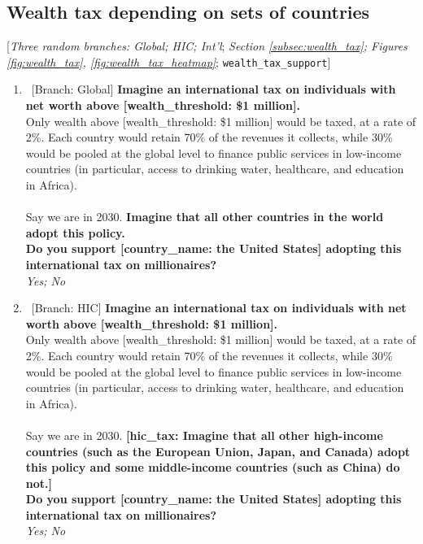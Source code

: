 \documentclass[12pt,english]{article}
\begin{document}
\begin{bibunit}
\begin{enumerate}[resume]
\end{enumerate} 

 \subsection*{Wealth tax depending on sets of countries} 
 [\textit{Three random branches: Global; HIC; Int'l}; \textit{Section \ref{subsec:wealth_tax}; Figures \ref{fig:wealth_tax}, \ref{fig:wealth_tax_heatmap}}; 
 \verb|wealth_tax_support|] 
 \begin{enumerate}[resume] %
\item ~[Branch: Global] \label{q:global_tax_support} \textbf{Imagine an international tax on individuals with net worth above [wealth\_threshold: \$1 million].~}\\Only wealth above [wealth\_threshold: \$1 million] would be taxed, at a rate of 2\%. Each country would retain 70\% of the revenues it collects, while 30\% would be pooled at the global level to finance public services in low-income countries (in particular, access to drinking water, healthcare, and education in Africa). \\\\Say we are in 2030. \textbf{Imagine that all other countries in the world adopt this policy. \\Do you support [country\_name: the United States] adopting this international tax on millionaires?}
  \\ \textit{Yes; No}

\item ~[Branch: HIC] \label{q:hic_tax_support} \textbf{Imagine an international tax on individuals with net worth above [wealth\_threshold: \$1 million].~}\\Only wealth above [wealth\_threshold: \$1 million] would be taxed, at a rate of 2\%. Each country would retain 70\% of the revenues it collects, while 30\% would be pooled at the global level to finance public services in low-income countries (in particular, access to drinking water, healthcare, and education in Africa). \\\\Say we are in 2030. \textbf{[hic\_tax: Imagine that all other high-income countries (such as the European Union, Japan, and Canada) adopt this policy and some middle-income countries (such as China) do not.]}\textbf{~\\Do you support [country\_name: the United States] adopting this international tax on millionaires?}
  \\ \textit{Yes; No}


\end{enumerate}
\end{bibunit}
\end{document}
